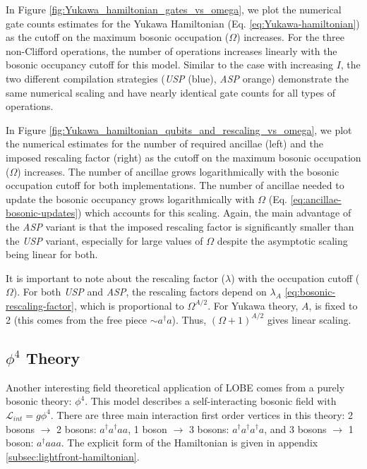 In Figure \ref{fig:Yukawa_hamiltonian_gates_vs_omega}, we plot the numerical gate counts estimates for the Yukawa Hamiltonian (Eq. \ref{eq:Yukawa-hamiltonian}) as the cutoff on the maximum bosonic occupation ($\Omega$) increases.
For the three non-Clifford operations, the number of operations increases linearly with the bosonic occupancy cutoff for this model.
Similar to the case with increasing $I$, the two different compilation strategies (\textit{USP} (blue), \textit{ASP} orange) demonstrate the same numerical scaling and have nearly identical gate counts for all types of operations.

In Figure \ref{fig:Yukawa_hamiltonian_qubits_and_rescaling_vs_omega}, we plot the numerical estimates for the number of required ancillae (left) and the imposed rescaling factor (right) as the cutoff on the maximum bosonic occupation ($\Omega$) increases.
The number of ancillae grows logarithmically with the bosonic occupation cutoff for both implementations.
The number of ancillae needed to update the bosonic occupancy grows logarithmically with $\Omega$ (Eq. \ref{eq:ancillae-bosonic-updates}) which accounts for this scaling.
Again, the main advantage of the \textit{ASP} variant is that the imposed rescaling factor is significantly smaller than the \textit{USP} variant, especially for large values of $\Omega$ despite the asymptotic scaling being linear for both.

It is important to note about the rescaling factor ($\lambda$) with the occupation cutoff ($\Omega$). For both \textit{USP} and \textit{ASP}, the rescaling factors depend on $\lambda_A$ \ref{eq:bosonic-rescaling-factor}, which is proportional to $\Omega^{A/2}$. 
For Yukawa theory, $A$, is fixed to 2 (this comes from the free piece $\sim a^\dagger a$). Thus, $(\Omega + 1)^{A/2}$ gives linear scaling. 


\subsection{$\phi^4$ Theory}
Another interesting field theoretical application of LOBE comes from a purely bosonic theory: $\phi^4$. This model describes a self-interacting bosonic field with $\mathcal{L}_{int} = g\phi^4$. 
There are three main interaction first order vertices in this theory: 2 bosons $\rightarrow$ 2 bosons: $a^\dagger a^\dagger a a$, 1 boson $\rightarrow$ 3 bosons: $a^\dagger a^\dagger a^\dagger a$, and 3 bosons $\rightarrow$ 1 boson: $a^\dagger a a a$. 
The explicit form of the Hamiltonian is given in appendix \ref{subsec:lightfront-hamiltonian}.

